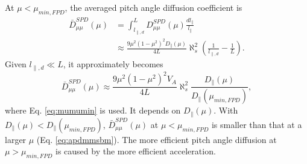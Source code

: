 \documentclass[preprint2,twocolumn,times,tighten]{aastex63}
\begin{document}
{At $\mu< \mu_{min,FPD}$, the averaged pitch angle diffusion coefficient is 
\begin{equation}
\begin{aligned}
  \bar{D}_{\mu\mu}^{SPD}(\mu) &=
  \int_{l_{\|,d}}^{L} D_{\mu\mu}^{SPD}(\mu) \frac{dl_\|}{l_\|} \\
&\approx   \frac{9\mu^2(1-\mu^2)^2D_\|(\mu)}{4L}\aleph_s^2\left(\frac{1}{l_{\|,d}}-\frac{1}{L}\right).
\end{aligned}
\end{equation}
Given $l_{\|,d}\ll L$, it approximately becomes 
\begin{equation}
\bar{D}_{\mu\mu}^{SPD}(\mu) \approx 
   \frac{9\mu^2(1-\mu^2)^2 V_A }{4L}\aleph_s^2\frac{D_\|(\mu)}{D_\|(\mu_{min,FPD})},
\end{equation}
where Eq. \eqref{eq:mumumin} is used. It depends on $D_{\|}(\mu)$. 
With $D_{\|}(\mu) < D_{\|}(\mu_{min,FPD})$, 
$\bar{D}_{\mu\mu}^{SPD}(\mu)$ at $\mu<\mu_{min,FPD}$ is smaller than that at a larger $\mu$ (Eq. \eqref{eq:apdmmsbm}). 
{The more efficient pitch angle diffusion at $\mu > \mu_{min,FPD}$ is caused by the more efficient acceleration. }










}
\end{document}

